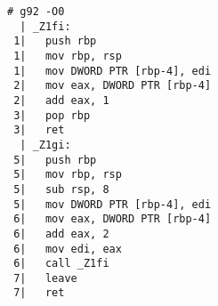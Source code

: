 \begin{lstlisting}[language={},numbers=none,title=\href{https://godbolt.org/z/87GK4q}{\texttt{godbolt.org/z/87GK4q}}]
# g92 -O0
  | _Z1fi:
 1|   push rbp
 1|   mov rbp, rsp
 1|   mov DWORD PTR [rbp-4], edi
 2|   mov eax, DWORD PTR [rbp-4]
 2|   add eax, 1
 3|   pop rbp
 3|   ret
  | _Z1gi:
 5|   push rbp
 5|   mov rbp, rsp
 5|   sub rsp, 8
 5|   mov DWORD PTR [rbp-4], edi
 6|   mov eax, DWORD PTR [rbp-4]
 6|   add eax, 2
 6|   mov edi, eax
 6|   call _Z1fi
 7|   leave
 7|   ret
\end{lstlisting}
